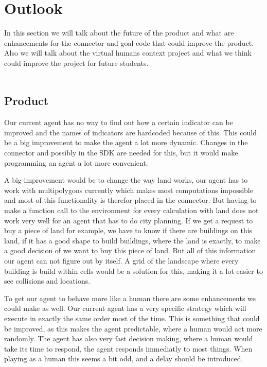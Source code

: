 \chapter{Outlook}
In this section we will talk about the future of the product and what are enhancements for the connector and goal code that could improve the product. Also we will talk about the virtual humans context project and what we think could improve the project for future students.
\\
\\
\section {Product}
Our current agent has no way to find out how a certain indicator can be improved and the names of indicators are hardcoded because of this. This could be a big improvement to make the agent a lot more dynamic. Changes in the connector and possibly in the SDK are needed for this, but it would make programming an agent a lot more convenient.

A big improvement would be to change the way land works, our agent has to work with multipolygons currently which makes most computations impossible and most of this functionality is therefor placed in the connector. But having to make a function call to the environment for every calculation with land does not work very well for an agent that has to do city planning. If we get a request to buy a piece of land for example, we have to know if there are buildings on this land, if it has a good shape to build buildings, where the land is exactly, to make a good decision of we want to buy this piece of land. But all of this information our agent can not figure out by itself. A grid of the landscape where every building is build within cells would be a solution for this, making it a lot easier to see collisions and locations.

To get our agent to behave more like a human there are some enhancements we could make as well. Our current agent has a very specific strategy which will execute in exactly the same order most of the time. This is something that could be improved, as this makes the agent predictable, where a human would act more randomly. The agent has also very fast decision making, where a human would take its time to respond, the agent responds immediatly to most things. When playing as a human this seems a bit odd, and a delay should be introduced.
\\
\\

